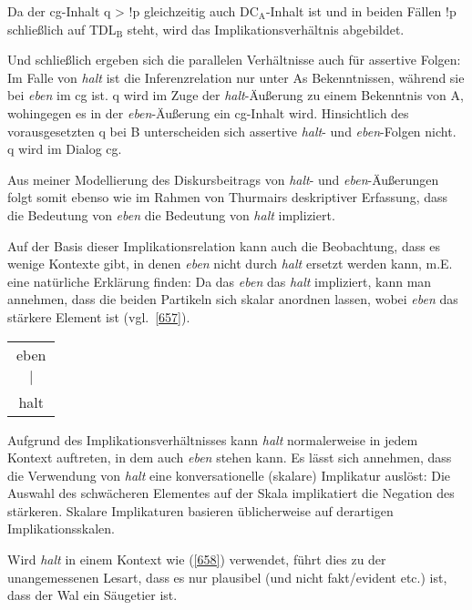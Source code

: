 Da der cg-Inhalt q > !p gleichzeitig auch DC$_{\textrm{A}}$-Inhalt ist und in beiden Fällen !p schließlich auf TDL$_{\textrm{B}}$ steht, wird das Implikationsverhältnis abgebildet.
	
Und schließlich ergeben sich die parallelen Verhältnisse auch für assertive Folgen: Im Falle von \textit{halt} ist die Inferenzrelation nur unter As Bekenntnissen, während sie bei \textit{eben} im cg ist. q wird im Zuge der \textit{halt}-Äußerung zu einem Bekenntnis von A, wohingegen es in der \textit{eben}-Äußerung ein cg-Inhalt wird. Hinsichtlich des vorausgesetzten q bei B unterscheiden sich assertive \textit{halt}- und \textit{eben}-Folgen nicht. q wird im Dialog cg.

Aus meiner Modellierung des Diskursbeitrags von \textit{halt}- und \textit{eben}-Äußerungen folgt somit ebenso wie im Rahmen von Thurmairs deskriptiver Erfassung, dass die Bedeutung von \textit{eben} die Bedeutung von \textit{halt} impliziert. 

Auf der Basis dieser Implikationsrelation kann auch die Beobachtung, dass es wenige Kontexte gibt, in denen \textit{eben} nicht durch \textit{halt} ersetzt werden kann, m.E. eine natürliche Erklärung finden: Da das \textit{eben} das \textit{halt} impliziert, kann man annehmen, dass die beiden Partikeln sich skalar anordnen lassen, wobei \textit{eben} das stärkere Element ist (vgl.\ \ref{657}).

\begin{exe}
        \ex\label{657} 
          \begin{tabular}[t]{ccc}
   		 \multicolumn{3}{c}{eben}\\
         & $\vert$ & \\
        \multicolumn{3}{c}{halt}
    	\end{tabular}
\end{exe}
Aufgrund des Implikationsverhältnisses kann \textit{halt} normalerweise in jedem Kontext auftreten, in dem auch \textit{eben} stehen kann. Es lässt sich annehmen, dass die Verwendung von \textit{halt} eine konversationelle (skalare) Implikatur  auslöst: Die Auswahl des schwächeren Elementes auf der Skala implikatiert die Negation des stärkeren. Skalare Implikaturen basieren üblicherweise auf derartigen Implikationsskalen.

Wird \textit{halt} in einem Kontext wie (\ref{658}) verwendet, führt dies zu der unangemessenen Lesart, dass es nur plausibel (und nicht fakt/evident etc.) ist, dass der Wal ein Säugetier ist.

